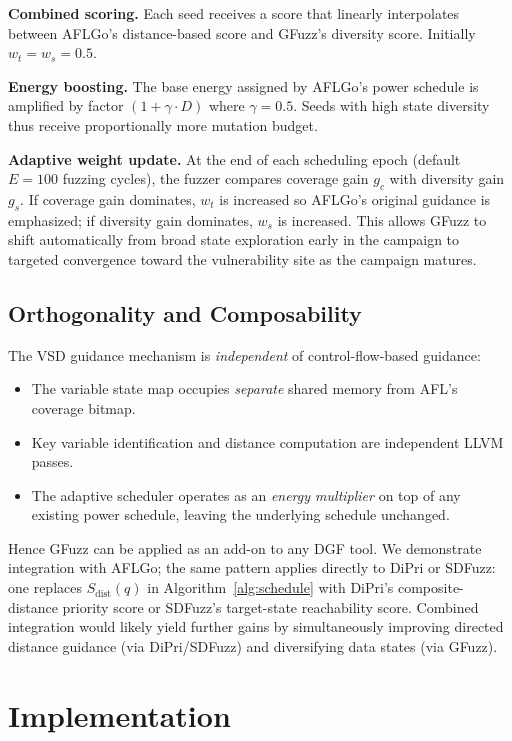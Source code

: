 \documentclass[preprint,12pt,3p]{elsarticle}
\begin{document}
\textbf{Combined scoring.}  Each seed receives a score that linearly
interpolates between AFLGo's distance-based score and GFuzz's diversity score.
Initially $w_t = w_s = 0.5$.

\textbf{Energy boosting.}  The base energy assigned by AFLGo's power
schedule is amplified by factor $(1 + \gamma \cdot D)$ where $\gamma = 0.5$.
Seeds with high state diversity thus receive proportionally more mutation
budget.

\textbf{Adaptive weight update.}  At the end of each scheduling epoch
(default $E = 100$ fuzzing cycles), the fuzzer compares coverage gain $g_c$
with diversity gain $g_s$.  If coverage gain dominates, $w_t$ is increased
so AFLGo's original guidance is emphasized; if diversity gain dominates,
$w_s$ is increased.  This allows GFuzz to shift automatically from broad
state exploration early in the campaign to targeted convergence toward the
vulnerability site as the campaign matures.

\subsection{Orthogonality and Composability}
\label{sec:composable}

The VSD guidance mechanism is \emph{independent} of control-flow-based
guidance:
\begin{itemize}
  \item The variable state map occupies \emph{separate} shared memory from
    AFL's coverage bitmap.
  \item Key variable identification and distance computation are independent
    LLVM passes.
  \item The adaptive scheduler operates as an \emph{energy multiplier} on
    top of any existing power schedule, leaving the underlying schedule
    unchanged.
\end{itemize}
Hence GFuzz can be applied as an add-on to any DGF tool.  We demonstrate
integration with AFLGo; the same pattern applies directly to DiPri or
SDFuzz: one replaces $S_{\text{dist}}(q)$ in Algorithm~\ref{alg:schedule}
with DiPri's composite-distance priority score or SDFuzz's target-state
reachability score.  Combined integration would likely yield further gains
by simultaneously improving directed distance guidance (via DiPri/SDFuzz)
and diversifying data states (via GFuzz).

\section{Implementation}
\label{sec:impl}
\end{document}
